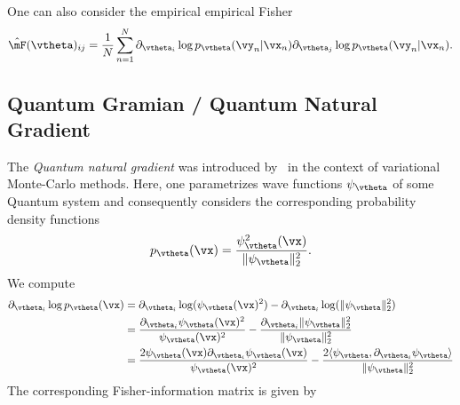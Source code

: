 One can also consider the empirical empirical Fisher
\begin{align}
    \hat{\mF}(\vtheta)_{ij} = \frac1N\sum_{n=1}^N  \partial_{\vtheta_i} \log p_{\vtheta}(\vy_n|\vx_n) \partial_{\vtheta_j} \log p_{\vtheta}(\vy_n|\vx_n).
\end{align}

\subsection{Quantum Gramian / Quantum Natural Gradient}

The \emph{Quantum natural gradient} was introduced by~\cite{stokes2020quantum} in the context of variational Monte-Carlo methods. Here, one parametrizes wave functions $\psi_\vtheta$ of some Quantum system  %
and consequently considers the corresponding probability density functions
\begin{align}
    p_\vtheta(\vx) = \frac{\psi_\vtheta^2(\vx)}{\lVert \psi_\vtheta \rVert_2^2}.
\end{align}
We compute
\begin{align}
    \partial_{\vtheta_i} \log p_{\vtheta}(\vx) & = \partial_{\vtheta_i} \log(\psi_{\vtheta}(\vx)^2) - \partial_{\vtheta_i} \log(\lVert \psi_{\vtheta}\rVert_2^2)
    \\ & = \frac{\partial_{\vtheta_i} \psi_\vtheta(\vx)^2}{\psi_\vtheta(\vx)^2} - \frac{\partial_{\vtheta_i} \lVert\psi_\vtheta \rVert_2^2}{\lVert\psi_\vtheta \rVert_2^2}
    \\ & = \frac{2\psi_\vtheta(\vx)\partial_{\vtheta_i} \psi_\vtheta(\vx)}{\psi_\vtheta(\vx)^2} - \frac{2 \langle \psi_\vtheta, \partial_{\vtheta_i} \psi_\vtheta \rangle }{\lVert\psi_\vtheta \rVert_2^2}
\end{align}
The corresponding Fisher-information matrix is given by
